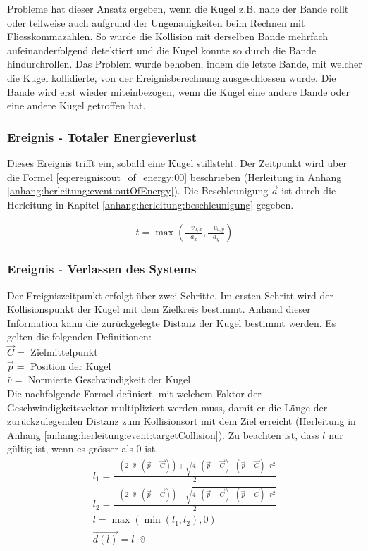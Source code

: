 Probleme hat dieser Ansatz ergeben, wenn die Kugel z.B. nahe der Bande rollt oder teilweise auch aufgrund der Ungenauigkeiten
beim Rechnen mit Fliesskommazahlen. So wurde die Kollision mit derselben Bande mehrfach aufeinanderfolgend detektiert und
die Kugel konnte so durch die Bande hindurchrollen. Das Problem wurde behoben, indem
die letzte Bande, mit welcher die Kugel kollidierte, von der Ereignisberechnung ausgeschlossen wurde. Die Bande wird
erst wieder miteinbezogen, wenn die Kugel eine andere Bande oder eine andere Kugel getroffen hat.

\subsubsection{Ereignis - Totaler Energieverlust}
Dieses Ereignis trifft ein, sobald eine Kugel stillsteht.
Der Zeitpunkt wird über die Formel \ref{eq:ereignis:out_of_energy:00} beschrieben (Herleitung in Anhang \ref{anhang:herleitung:event:outOfEnergy}).
Die Beschleunigung $\vec{a}$ ist durch die Herleitung in Kapitel \ref{anhang:herleitung:beschleunigung} gegeben.

\begin{align}
    t = \max{(\frac{-v_{0,x}}{a_x}, \frac{-v_{0,y}}{a_y})}\label{eq:ereignis:out_of_energy:00}
\end{align}

\subsubsection{Ereignis - Verlassen des Systems}
Der Ereigniszeitpunkt erfolgt über zwei Schritte. Im ersten Schritt wird der Kollisionspunkt der Kugel mit dem
Zielkreis bestimmt. Anhand dieser Information kann die zurückgelegte Distanz der Kugel bestimmt werden.
Es gelten die folgenden Definitionen:\\
$\vec{C} = $ Zielmittelpunkt\\
$\vec{p} = $ Position der Kugel\\
$\hat{v} = $ Normierte Geschwindigkeit der Kugel\\

Die nachfolgende Formel definiert, mit welchem Faktor der Geschwindigkeitsvektor multipliziert werden muss, damit
er die Länge der zurückzulegenden Distanz zum Kollisionsort mit dem Ziel erreicht (Herleitung in Anhang \ref{anhang:herleitung:event:targetCollision}).
Zu beachten ist, dass $l$ nur gültig ist, wenn es grösser als $0$ ist.
\begin{align}
    l_1 = \frac{-(2 \cdot \hat{v} \cdot (\vec{p} - \vec{C})) + \sqrt{4 \cdot (\vec{p} - \vec{C}) \cdot (\vec{p} - \vec{C}) \cdot r^2}}{2}\\
    l_2 = \frac{-(2 \cdot \hat{v} \cdot (\vec{p} - \vec{C})) - \sqrt{4 \cdot (\vec{p} - \vec{C}) \cdot (\vec{p} - \vec{C}) \cdot r^2}}{2}\\
    l = \max{(\min{(l_1, l_2)}, 0)}\\
    \vec{d(l)} = l \cdot \hat{v}
\end{align}

